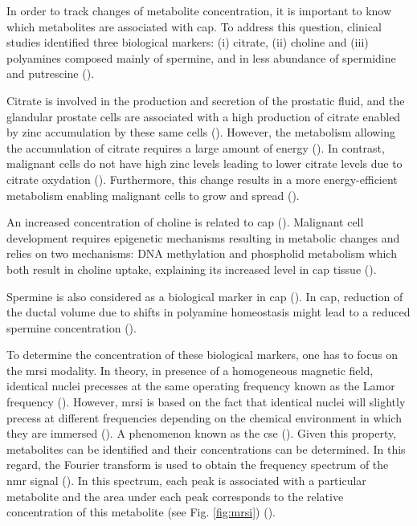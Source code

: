\begin{enumerate}[leftmargin=*]
In order to track changes of metabolite concentration, it is important to know which metabolites are associated with \ac{cap}. To address this question, clinical studies identified three biological markers: (i) citrate, (ii) choline and (iii) polyamines composed mainly of spermine, and in less abundance of spermidine and putrescine (\cite{Awwad2012,Costello2006,Giskeodegard2013}). 

Citrate is involved in the production and secretion of the prostatic fluid, and the glandular prostate cells are associated with a high production of citrate enabled by zinc accumulation by these same cells (\cite{Costello2006}). However, the metabolism allowing the accumulation of citrate requires a large amount of energy (\cite{Costello2006}). In contrast, malignant cells do not have high zinc levels leading to lower citrate levels due to citrate oxydation (\cite{Costello2006}). Furthermore, this change results in a more energy-efficient metabolism enabling malignant cells to grow and spread (\cite{Costello2006}).

An increased concentration of choline is related to \ac{cap} (\cite{Awwad2012}). Malignant cell development requires epigenetic mechanisms resulting in metabolic changes and relies on two mechanisms: DNA methylation and phospholid metabolism which both result in choline uptake, explaining its increased level in \ac{cap} tissue (\cite{Awwad2012}).

Spermine is also considered as a biological marker in \ac{cap} (\cite{Graaf2000,Giskeodegard2013}). In \ac{cap}, reduction of the ductal volume due to shifts in polyamine homeostasis might lead to a reduced spermine concentration (\cite{Graaf2000}).

To determine the concentration of these biological markers, one has to focus on the \ac{mrsi} modality. In theory, in presence of a homogeneous magnetic field, identical nuclei precesses at the same operating frequency known as the Lamor frequency (\cite{Haacke1999}). However, \ac{mrsi} is based on the fact that identical nuclei will slightly precess at different frequencies depending on the chemical environment in which they are immersed (\cite{Haacke1999}). A phenomenon known as the \ac{cse} (\cite{Parfait2010}). Given this property, metabolites can be identified and their concentrations can be determined. In this regard, the Fourier transform is used to obtain the frequency spectrum of the \ac{nmr} signal (\cite{Haacke1999,Parfait2010}). In this spectrum, each peak is associated with a particular metabolite and the area under each peak corresponds to the relative concentration of this metabolite (see Fig. \ref{fig:mrsi}) (\cite{Parfait2010}).


\end{enumerate}
